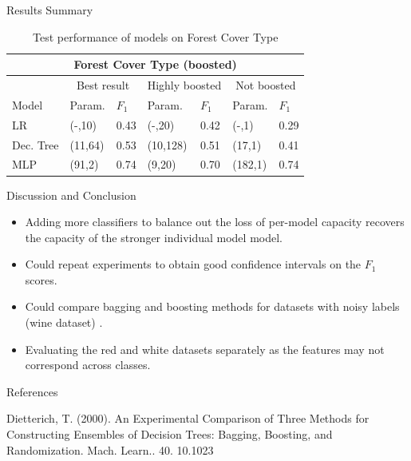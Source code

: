 \documentclass[final]{beamer}
\newlength{\onecolwid}
\begin{document}
\begin{frame}[t]
\begin{columns}[t]
\begin{column}{\onecolwid}
\begin{block}{Results Summary}
\begin{table}[h!]
    \caption {Test performance of models on Forest Cover Type }
    \vspace{-65pt}
    \begin{center}
    \begin{tabular}{|l|l|l|l|l|l|l|}
        \hline
        \multicolumn{7}{|c|}{Forest Cover Type (boosted)}\\
        \hline
        &\multicolumn{2}{|c|}{Best result}&\multicolumn{2}{|c|}{Highly boosted}&\multicolumn{2}{|c|}{Not boosted}\\
        \hline
        Model & Param. & $F_1$ & Param. & $F_1$ & Param. & $F_1$ \\
        \hline \hline
         LR & (-,10) & 0.43 & (-,20) & 0.42 & (-,1) & 0.29 \\
         Dec. Tree & (11,64) & 0.53 & (10,128) & 0.51 & (17,1) & 0.41 \\
         MLP  & (91,2) & 0.74 & (9,20) & 0.70 & (182,1) & 0.74 \\
         \hline
    \end{tabular}
    \end{center}
    \label{Table:Results_Forest}
\end{table}

\end{block}

\begin{block}{Discussion and Conclusion}

\begin{itemize}
    \item Adding more classifiers to balance out the loss of per-model capacity recovers the capacity of the stronger individual model model.
    \item Could repeat experiments to obtain good confidence intervals on the $F_1$ scores.
    \item Could compare bagging and boosting methods for datasets with noisy labels (wine dataset) \cite{Diet}.
    \item Evaluating the red and white datasets separately as the features may not correspond across classes.
\end{itemize}

\end{block}

\begin{block}{References}
\begin{thebibliography}{99}
     Dietterich, T. (2000). An Experimental Comparison of Three Methods for Constructing Ensembles of Decision Trees: Bagging, Boosting, and Randomization. Mach. Learn.. 40. 10.1023
\end{thebibliography}


\end{block}
\end{column}
\end{columns}
\end{frame}
\end{document}
